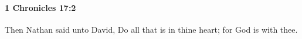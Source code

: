 
		\paragraph{1 Chronicles 17:2} %
			\label{1CHRONICLES-17-2}

			Then Nathan said unto David, Do all that is in thine heart; for God is with thee.


